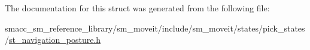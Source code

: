 The documentation for this struct was generated from the following file\+:\begin{DoxyCompactItemize}
\item 
smacc\+\_\+sm\+\_\+reference\+\_\+library/sm\+\_\+moveit/include/sm\+\_\+moveit/states/pick\+\_\+states/\hyperlink{st__navigation__posture_8h}{st\+\_\+navigation\+\_\+posture.\+h}\end{DoxyCompactItemize}

